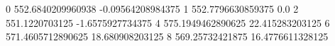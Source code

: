 0 552.6840209960938 -0.09564208984375
1 552.7796630859375 0.0
2 551.1220703125 -1.6575927734375
4 575.1949462890625 22.415283203125
6 571.4605712890625 18.680908203125
8 569.25732421875 16.4776611328125
